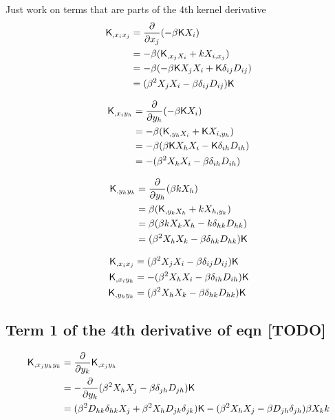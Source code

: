 Just work on terms that are parts of the 4th kernel derivative 
\begin{align*}
\mathsf{K}_{,x_i x_j} &= \frac{\partial}{\partial x_j} (-\beta \mathsf{K} X_i)\\
&= -\beta(\mathsf{K}_{,x_j X_i} + k X_{i, x_j})\\ 
&= -\beta(-\beta \mathsf{K} X_j X_i + \mathsf{K} \delta_{ij} D_{ij}) \\ 
&= (\beta^2 X_j X_i - \beta \delta_{ij} D_{ij})\mathsf{K} 
\end{align*}

\begin{align*}
\mathsf{K}_{,x_i y_h} &= \frac{\partial}{\partial y_h} (-\beta \mathsf{K} X_i)\\
&= -\beta(\mathsf{K}_{,y_h X_i} + \mathsf{K} X_{i, y_h})\\ 
&= -\beta(\beta \mathsf{K} X_h X_i - \mathsf{K} \delta_{ih} D_{ih}) \\ 
&= -(\beta^2 X_h X_i - \beta \delta_{ih} D_{ih})  
\end{align*}

\begin{align*}
\mathsf{K}_{,y_h y_k} &= \frac{\partial}{\partial y_h} (\beta k X_h)\\
&= \beta(\mathsf{K}_{,y_k X_h} + k X_{h, y_k})\\ 
&= \beta(\beta k X_k X_h - k \delta_{hk} D_{hk}) \\ 
&= (\beta^2 X_h X_k - \beta \delta_{hk} D_{hk})\mathsf{K} 
\end{align*}

\begin{align}
\mathsf{K}_{,x_i x_j} &= (\beta^2 X_j X_i - \beta \delta_{ij} D_{ij})\mathsf{K}\\ 
\mathsf{K}_{,x_i y_h} &= -(\beta^2 X_h X_i - \beta \delta_{ih} D_{ih})\mathsf{K}\\ 
\mathsf{K}_{,y_h y_k} &= (\beta^2 X_h X_k - \beta \delta_{hk} D_{hk})\mathsf{K} 
\end{align}

\subsection{Term 1 of the 4th derivative of eqn [TODO]}
\begin{align*}
\mathsf{K}_{,x_j y_h y_k}
&= \frac{\partial}{\partial y_k} \mathsf{K}_{,x_j y_h}\\ 
&= -\frac{\partial}{\partial y_k} (\beta^2 X_h X_j - \beta \delta_{jh} D_{jh})\mathsf{K}\\
&= (\beta^2 D_{hk} \delta_{hk} X_j + \beta^2 X_h D_{jk}\delta_{jk})\mathsf{K} -
(\beta^2 X_h X_j - \beta D_{jh} \delta_{jh})\beta X_k k
\end{align*}

